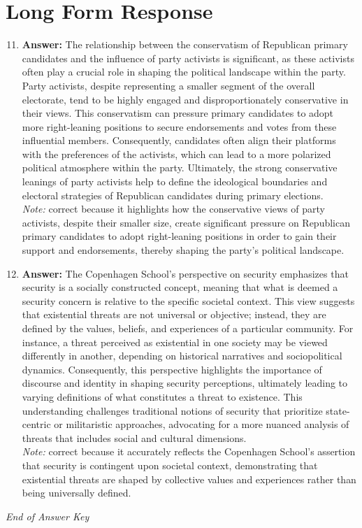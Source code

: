 \documentclass[12pt]{article}
\begin{document}
\section*{Long Form Response}
\begin{enumerate}[label=\arabic*.]
\setcounter{enumi}{10}
\item \textbf{Answer:} The relationship between the conservatism of Republican primary candidates and the influence of party activists is significant, as these activists often play a crucial role in shaping the political landscape within the party. Party activists, despite representing a smaller segment of the overall electorate, tend to be highly engaged and disproportionately conservative in their views. This conservatism can pressure primary candidates to adopt more right-leaning positions to secure endorsements and votes from these influential members. Consequently, candidates often align their platforms with the preferences of the activists, which can lead to a more polarized political atmosphere within the party. Ultimately, the strong conservative leanings of party activists help to define the ideological boundaries and electoral strategies of Republican candidates during primary elections.
\\ \textit{Note:} correct because it highlights how the conservative views of party activists, despite their smaller size, create significant pressure on Republican primary candidates to adopt right-leaning positions in order to gain their support and endorsements, thereby shaping the party's political landscape.
\item \textbf{Answer:} The Copenhagen School's perspective on security emphasizes that security is a socially constructed concept, meaning that what is deemed a security concern is relative to the specific societal context. This view suggests that existential threats are not universal or objective; instead, they are defined by the values, beliefs, and experiences of a particular community. For instance, a threat perceived as existential in one society may be viewed differently in another, depending on historical narratives and sociopolitical dynamics. Consequently, this perspective highlights the importance of discourse and identity in shaping security perceptions, ultimately leading to varying definitions of what constitutes a threat to existence. This understanding challenges traditional notions of security that prioritize state-centric or militaristic approaches, advocating for a more nuanced analysis of threats that includes social and cultural dimensions.
\\ \textit{Note:} correct because it accurately reflects the Copenhagen School's assertion that security is contingent upon societal context, demonstrating that existential threats are shaped by collective values and experiences rather than being universally defined.
\end{enumerate}

\vfill
\noindent\textit{End of Answer Key}
\end{document}
